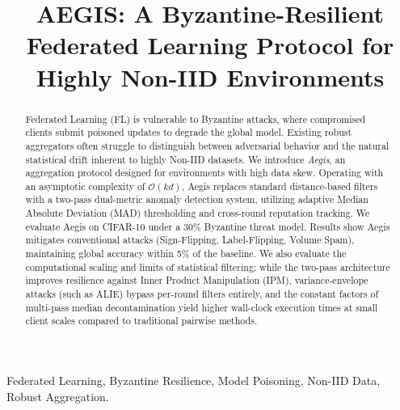\documentclass[10pt, conference]{IEEEtran}
\begin{document}
\title{AEGIS: A Byzantine-Resilient Federated Learning Protocol for Highly Non-IID Environments}

\author{
\and
{}
}

\maketitle

\begin{abstract}
Federated Learning (FL) is vulnerable to Byzantine attacks, where compromised clients submit poisoned updates to degrade the global model. Existing robust aggregators often struggle to distinguish between adversarial behavior and the natural statistical drift inherent to highly Non-IID datasets. We introduce \textit{Aegis}, an aggregation protocol designed for environments with high data skew. Operating with an asymptotic complexity of $\mathcal{O}(kd)$, Aegis replaces standard distance-based filters with a two-pass dual-metric anomaly detection system, utilizing adaptive Median Absolute Deviation (MAD) thresholding and cross-round reputation tracking. We evaluate Aegis on CIFAR-10 under a 30\% Byzantine threat model. Results show Aegis mitigates conventional attacks (Sign-Flipping, Label-Flipping, Volume Spam), maintaining global accuracy within 5\% of the baseline. We also evaluate the computational scaling and limits of statistical filtering: while the two-pass architecture improves resilience against Inner Product Manipulation (IPM), variance-envelope attacks (such as ALIE) bypass per-round filters entirely, and the constant factors of multi-pass median decontamination yield higher wall-clock execution times at small client scales compared to traditional pairwise methods.
\end{abstract}

\begin{IEEEkeywords}
Federated Learning, Byzantine Resilience, Model Poisoning, Non-IID Data, Robust Aggregation.
\end{IEEEkeywords}
\end{document}
